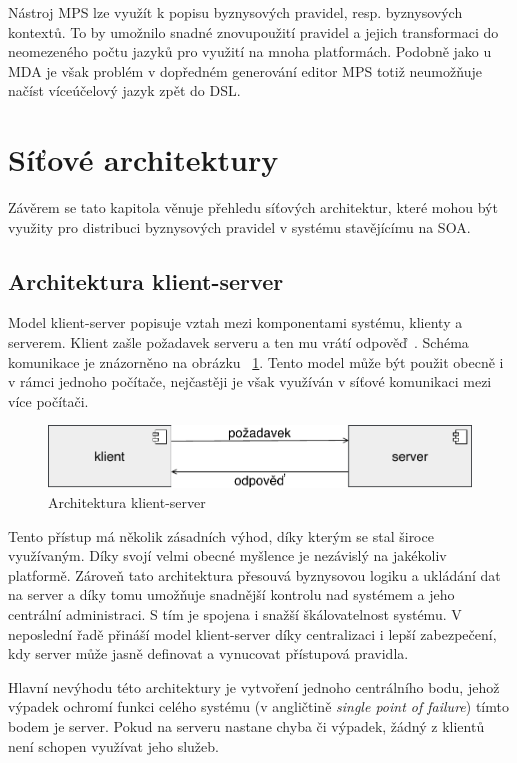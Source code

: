 Nástroj MPS lze využít k popisu byznysových pravidel, resp. byznysových kontextů.
To by umožnilo snadné znovupoužití pravidel a jejich transformaci do neomezeného počtu jazyků pro
využití na mnoha platformách. Podobně jako u \gls{MDA} je však problém v dopředném
generování \textendash\xspace editor MPS totiž neumožňuje načíst víceúčelový jazyk zpět do \gls{DSL}.


\section{Síťové architektury}

Závěrem se tato kapitola věnuje přehledu síťových architektur, které mohou být využity pro
distribuci byznysových pravidel v systému stavějícímu na \gls{SOA}.

\subsection{Architektura klient-server}\label{sec:client-server}

Model klient-server popisuje vztah mezi komponentami systému, klienty a serverem.
Klient zašle požadavek serveru a ten mu vrátí odpověď~\cite{berson1992client}.
Schéma komunikace je znázorněno na obrázku ~\ref{fig:client-server}.
Tento model může být použit obecně i v rámci jednoho počítače,
nejčastěji je však využíván v síťové komunikaci mezi více počítači.

\begin{figure}[t]
    \centering
    \includegraphics[keepaspectratio=true, width=0.6\linewidth]{figures/client-server.pdf}
    \caption{Architektura klient-server}
    \label{fig:client-server}
\end{figure}

Tento přístup má několik zásadních výhod, díky kterým se stal
široce využívaným. Díky svojí velmi obecné myšlence je nezávislý
na jakékoliv platformě.
Zároveň tato architektura přesouvá byznysovou logiku a
ukládání dat na server a díky tomu umožňuje
snadnější kontrolu nad systémem a jeho centrální administraci. S tím
je spojena i snažší škálovatelnost systému. V neposlední řadě
přináší model klient-server díky centralizaci i lepší zabezpečení,
kdy server může jasně definovat a vynucovat přístupová pravidla.

Hlavní nevýhodu této architektury je vytvoření jednoho centrálního bodu,
jehož výpadek ochromí funkci celého systému (v angličtině
\textit{single point of failure}) \textendash\xspace tímto bodem je server.
Pokud na serveru nastane chyba či výpadek, žádný z klientů není schopen využívat
jeho služeb.

